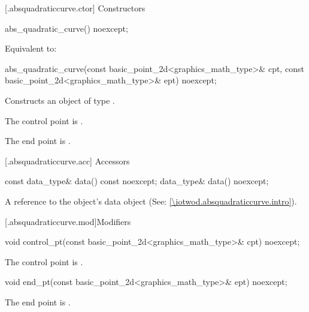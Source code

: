  [\iotwod.absquadraticcurve.ctor] {Constructors}%

%
\begin{itemdecl}
abs_quadratic_curve() noexcept;
\end{itemdecl}
\begin{itemdescr}
\pnum
\effects Equivalent to: 
\end{itemdescr}

%
\begin{itemdecl}
abs_quadratic_curve(const basic_point_2d<graphics_math_type>& cpt,
  const basic_point_2d<graphics_math_type>& ept) noexcept;
\end{itemdecl}
\begin{itemdescr}
\pnum
\effects Constructs an object of type .

\pnum
\remarks The control point is .

\pnum
\remarks The end point is .
\end{itemdescr}

 [\iotwod.absquadraticcurve.acc] {Accessors}%

%
\begin{itemdecl}
const data_type& data() const noexcept;
data_type& data() noexcept;
\end{itemdecl}
\begin{itemdescr}
\pnum
\returns A reference to the  object's data object (See: \ref{\iotwod.absquadraticcurve.intro}).
\end{itemdescr}

 [\iotwod.absquadraticcurve.mod]{Modifiers}%

%
\begin{itemdecl}
void control_pt(const basic_point_2d<graphics_math_type>& cpt) noexcept;
\end{itemdecl}
\begin{itemdescr}
\pnum
\effects The control point is .
\end{itemdescr}

%
\begin{itemdecl}
void end_pt(const basic_point_2d<graphics_math_type>& ept) noexcept;
\end{itemdecl}
\begin{itemdescr}
\pnum
\effects The end point is .
\end{itemdescr}

